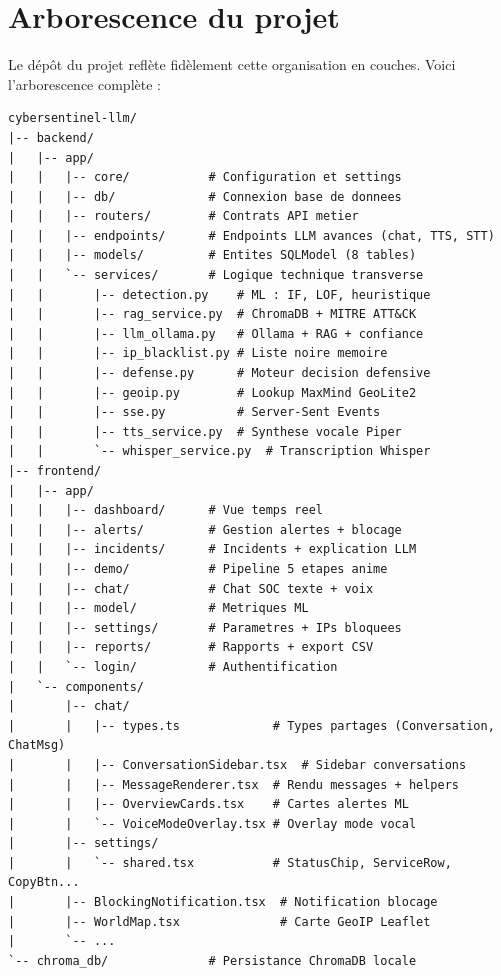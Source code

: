 \documentclass[12pt,a4paper]{report}
\begin{document}
\section{Arborescence du projet}
\begin{onehalfspace}
Le dépôt du projet reflète fidèlement cette organisation en couches.
Voici l'arborescence complète :
\end{onehalfspace}

\begin{tcolorbox}[colback=lightblue, colframe=darkblue, arc=5pt,
  title={\textbf{Structure du projet CyberSentinel-LLM}}]
\begin{small}
\begin{verbatim}
cybersentinel-llm/
|-- backend/
|   |-- app/
|   |   |-- core/           # Configuration et settings
|   |   |-- db/             # Connexion base de donnees
|   |   |-- routers/        # Contrats API metier
|   |   |-- endpoints/      # Endpoints LLM avances (chat, TTS, STT)
|   |   |-- models/         # Entites SQLModel (8 tables)
|   |   `-- services/       # Logique technique transverse
|   |       |-- detection.py    # ML : IF, LOF, heuristique
|   |       |-- rag_service.py  # ChromaDB + MITRE ATT&CK
|   |       |-- llm_ollama.py   # Ollama + RAG + confiance
|   |       |-- ip_blacklist.py # Liste noire memoire
|   |       |-- defense.py      # Moteur decision defensive
|   |       |-- geoip.py        # Lookup MaxMind GeoLite2
|   |       |-- sse.py          # Server-Sent Events
|   |       |-- tts_service.py  # Synthese vocale Piper
|   |       `-- whisper_service.py  # Transcription Whisper
|-- frontend/
|   |-- app/
|   |   |-- dashboard/      # Vue temps reel
|   |   |-- alerts/         # Gestion alertes + blocage
|   |   |-- incidents/      # Incidents + explication LLM
|   |   |-- demo/           # Pipeline 5 etapes anime
|   |   |-- chat/           # Chat SOC texte + voix
|   |   |-- model/          # Metriques ML
|   |   |-- settings/       # Parametres + IPs bloquees
|   |   |-- reports/        # Rapports + export CSV
|   |   `-- login/          # Authentification
|   `-- components/
|       |-- chat/
|       |   |-- types.ts             # Types partages (Conversation, ChatMsg)
|       |   |-- ConversationSidebar.tsx  # Sidebar conversations
|       |   |-- MessageRenderer.tsx  # Rendu messages + helpers
|       |   |-- OverviewCards.tsx    # Cartes alertes ML
|       |   `-- VoiceModeOverlay.tsx # Overlay mode vocal
|       |-- settings/
|       |   `-- shared.tsx           # StatusChip, ServiceRow, CopyBtn...
|       |-- BlockingNotification.tsx  # Notification blocage
|       |-- WorldMap.tsx              # Carte GeoIP Leaflet
|       `-- ...
`-- chroma_db/              # Persistance ChromaDB locale
\end{verbatim}
\end{small}
\end{tcolorbox}
\end{document}
